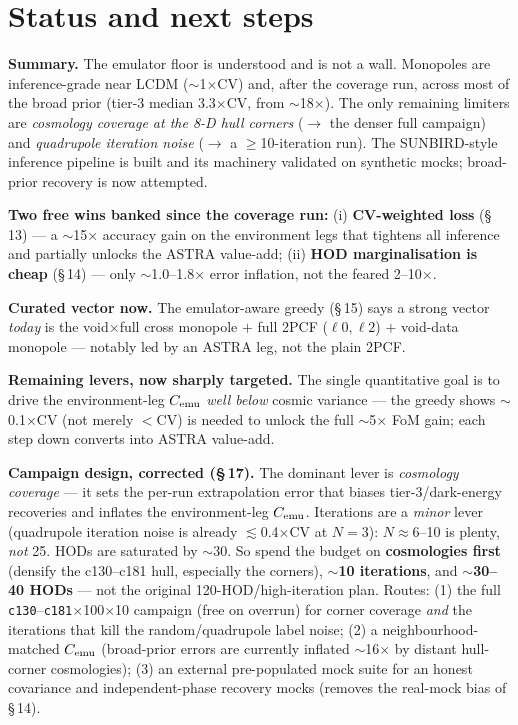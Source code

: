 \documentclass[11pt]{article}
\newcommand{\code}[1]{\texttt{#1}}
\begin{document}
\section{Status and next steps}
\textbf{Summary.} The emulator floor is understood and is not a wall. Monopoles are
inference-grade near LCDM ($\sim$1$\times$CV) and, after the coverage run, across most
of the broad prior (tier-3 median 3.3$\times$CV, from $\sim$18$\times$). The only
remaining limiters are \emph{cosmology coverage at the 8-D hull corners}
($\to$ the denser full campaign) and \emph{quadrupole iteration noise}
($\to$ a $\geq$10-iteration run). The SUNBIRD-style inference pipeline is built and
its machinery validated on synthetic mocks; broad-prior recovery is now attempted.

\textbf{Two free wins banked since the coverage run:} (i) \textbf{CV-weighted loss}
(\S\,13) --- a $\sim$15$\times$ accuracy gain on the environment legs that tightens all
inference and partially unlocks the ASTRA value-add; (ii) \textbf{HOD marginalisation
is cheap} (\S\,14) --- only $\sim$1.0--1.8$\times$ error inflation, not the feared
2--10$\times$.

\textbf{Curated vector now.} The emulator-aware greedy (\S\,15) says a strong vector
\emph{today} is the void$\times$full cross monopole $+$ full 2PCF ($\ell0,\ell2$) $+$
void-data monopole --- notably led by an ASTRA leg, not the plain 2PCF.

\textbf{Remaining levers, now sharply targeted.} The single quantitative goal is to
drive the environment-leg $C_{\rm emu}$ \emph{well below} cosmic variance --- the
greedy shows $\sim$0.1$\times$CV (not merely $<$CV) is needed to unlock the full
$\sim$5$\times$ FoM gain; each step down converts into ASTRA value-add.

\textbf{Campaign design, corrected (\S\,17).} The dominant lever is \emph{cosmology
coverage} --- it sets the per-run extrapolation error that biases tier-3/dark-energy
recoveries and inflates the environment-leg $C_{\rm emu}$. Iterations are a
\emph{minor} lever (quadrupole iteration noise is already $\lesssim$0.4$\times$CV at
$N=3$): $N\!\approx\!6$--10 is plenty, \emph{not} 25. HODs are saturated by $\sim$30.
So spend the budget on \textbf{cosmologies first} (densify the c130--c181 hull,
especially the corners), \textbf{$\sim$10 iterations}, and \textbf{$\sim$30--40 HODs} ---
not the original 120-HOD/high-iteration plan. Routes: (1) the full \code{c130}--\code{c181}$\times$100$\times$10 campaign
(free on overrun) for corner coverage \emph{and} the iterations that kill the
random/quadrupole label noise; (2) a neighbourhood-matched $C_{\rm emu}$ (broad-prior
errors are currently inflated $\sim$16$\times$ by distant hull-corner cosmologies);
(3) an external pre-populated mock suite for an honest covariance and independent-phase
recovery mocks (removes the real-mock bias of \S\,14).
\end{document}
